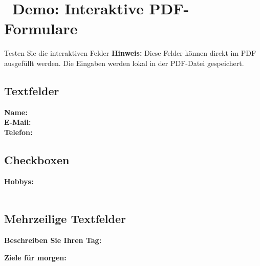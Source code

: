 \newpage
\section*{\textcolor{ctmmBlue}{\faEdit~Demo: Interaktive PDF-Formulare}}
\label{sec:demo-interactive}

\begin{ctmmBlueBox}{Testen Sie die interaktiven Felder}
\textbf{Hinweis:} Diese Felder können direkt im PDF ausgefüllt werden. Die Eingaben werden lokal in der PDF-Datei gespeichert.
\end{ctmmBlueBox}

\vspace{1cm}

\subsection*{Textfelder}
\textbf{Name:}  \\[0.5cm]
\textbf{E-Mail:}  \\[0.5cm]
\textbf{Telefon:} 

\vspace{1cm}

\subsection*{Checkboxen}
\textbf{Hobbys:} \\[0.3cm]
 \quad
{} \quad
{} \\[0.3cm]
 \quad
{} \quad
{}

\vspace{1cm}

\subsection*{Mehrzeilige Textfelder}
\textbf{Beschreiben Sie Ihren Tag:} \\[0.3cm]

\vspace{0.5cm}

\textbf{Ziele für morgen:} \\[0.3cm]

